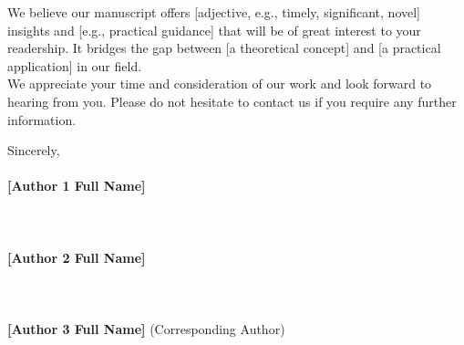 \documentclass[11pt]{article}
\begin{document}
We believe our manuscript offers [adjective, e.g., timely, significant, novel] insights and [e.g., practical guidance] that will be of great interest to your readership. It bridges the gap between [a theoretical concept] and [a practical application] in our field.\\

We appreciate your time and consideration of our work and look forward to hearing from you. Please do not hesitate to contact us if you require any further information.\\

\vspace{0.5cm}

\noindent Sincerely,\\
~\\

\noindent \textbf{[Author 1 Full Name]}\\
\\
\\
~\\
\noindent \textbf{[Author 2 Full Name]}\\
\\
\\
~\\
\noindent \textbf{[Author 3 Full Name]} (Corresponding Author)\\
\\
\\
\\
\\
~\\
\end{document}
